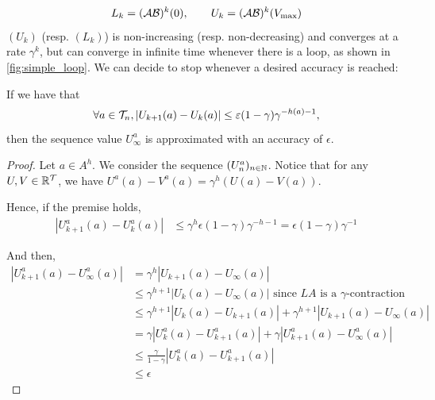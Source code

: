 \documentclass{article}
\begin{document}
\begin{equation}
    \label{eq:recursion}
    L_k = (\mathcal{A} \mathcal{B})^k(0), \qquad
    U_k = (\mathcal{A} \mathcal{B})^k(V_{\max})
\end{equation}
$(U_k)$ (resp. $(L_k)$) is non-increasing (resp. non-decreasing) and converges at a rate $\gamma^k$, but can converge in infinite time whenever there is a loop, as shown in \autoref{fig:simple_loop}. We can decide to stop whenever a desired accuracy is reached: 

\begin{proposition}
If we have that
\[\forall a\in\mathcal{T}_n, |U_{k+1}(a) - U_k(a)| \leq \varepsilon (1-\gamma)\gamma^{-h(a)-1},\]
then the sequence value $U^a_{\infty}$ is approximated with an accuracy of $\epsilon$.
\end{proposition}
\begin{proof}
Let $a\in A^h$. We consider the sequence $(U^a_n)_{n\in\mathbb{N}}$.
Notice that for any $U,V\in\mathbb{R}^{\mathcal{T}}$, we have $U^a(a)-V^a(a)=\gamma^h(U(a)-V(a))$.

Hence, if the premise holds,
\begin{align*}
    |U^a_{k+1}(a) - U^a_{k}(a)| &\leq \gamma^h\epsilon (1-\gamma)\gamma^{-h-1} = \epsilon (1-\gamma)\gamma^{-1}
\end{align*}

And then, 
\begin{align*}
|U^a_{k+1}(a) - U^a_\infty(a)| &= \gamma^h |U_{k+1}(a) - U_\infty(a)|\\
&\leq \gamma^{h+1}|U_{k}(a) - U_\infty(a)| \text{ since $LA$ is a $\gamma$-contraction}\\
&\leq \gamma^{h+1}|U_{k}(a) - U_{k+1}(a)| + \gamma^{h+1}|U_{k+1}(a) - U_\infty(a)|\\
&= \gamma|U^a_{k}(a) - U^a_{k+1}(a)| + \gamma |U^a_{k+1}(a) - U^a_\infty(a)|\\
&\leq \frac{\gamma}{1-\gamma} |U^a_{k}(a) - U^a_{k+1}(a)|\\
&\leq\epsilon
\end{align*}

\end{proof}
\end{document}
